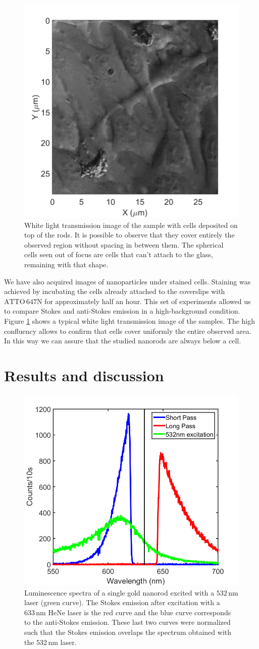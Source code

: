 \documentclass[journal=nalefd,manuscript=letter]{achemso}
\newcommand{\nm}{\ensuremath{\,\textrm{nm}}}
\newcommand{\atto}{\ensuremath{\textrm{ATTO}\,647\textrm{N}}}
\begin{document}
\begin{figure}[htp]
\centering
	\includegraphics[width=0.4\linewidth]{Figures/02_White_Light/white_light_scale.png}
	\caption{White light transmission image of the sample with cells deposited on
	top of the rods. It is possible to observe that they cover entirely the
	observed region without spacing in between them. The spherical cells seen out
	of focus are cells that can't attach to the glass, remaining with that shape.}
	\label{fig:white-light}
\end{figure}

We have also acquired images of nanoparticles under stained cells. Staining was
achieved by incubating the cells already attached to the coverslips with $\atto$
for approximately half an hour. This set of experiments allowed us to compare
Stokes and anti-Stokes emission in a high-background condition. Figure
\ref{fig:white-light} shows a typical white light transmission image of the
samples. The high confluency allows to confirm that cells cover uniformly the
entire observed area. In this way we can assure that the studied nanorods are
always below a cell.


\section{Results and discussion}

\begin{figure}[htp]
\centering
	\includegraphics[width=0.4\linewidth]{Figures/3_Curves.png}
	\caption{Luminescence spectra of a single gold nanorod excited with a $532\nm$
	laser (green curve). The Stokes emission after excitation with a $633\nm$
	HeNe laser is the red curve and the blue curve corresponds to the anti-Stokes
	emission. These last two curves were normalized such that the Stokes emission
	overlaps the spectrum obtained with the $532\nm$ laser.}
	\label{fig:spectra_rod}
\end{figure}
\end{document}
